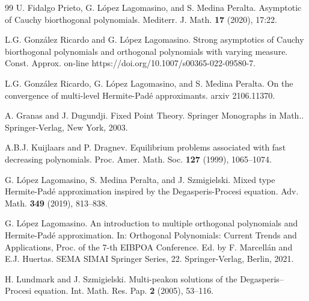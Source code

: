 \documentclass{amsart}
\numberwithin{equation}{section}
\theoremstyle{definition}
\begin{document}
\begin{thebibliography}{99}
     U. Fidalgo Prieto, G. López Lagomasino, and S. Medina Peralta. Asymptotic of Cauchy biorthogonal polynomials.  {Mediterr. J. Math.} \textbf{17} (2020), 17:22. %



 L.G. González Ricardo and G. López Lagomasino. Strong asymptotics of Cauchy biorthogonal polynomials and orthogonal polynomials with varying measure. Const. Approx. on-line
https://doi.org/10.1007/s00365-022-09580-7.

        L.G. González Ricardo, G. López Lagomasino, and S. Medina Peralta. On the convergence of multi-level Hermite-Padé approximants. arxiv 2106.11370.


     A. Granas and J. Dugundji. Fixed Point Theory. Springer Monographs in Math.. Springer-Verlag, New York, 2003.

     A.B.J. Kuijlaars and P. Dragnev. Equilibrium problems associated with fast decreasing polynomials. {Proc. Amer. Math. Soc.} \textbf{127} (1999), 1065--1074. %

     G. López Lagomasino, S. Medina Peralta, and J. Szmigielski. Mixed type Hermite-Padé approximation inspired by the Degasperis-Procesi equation.  {Adv. Math.} \textbf{349} (2019), 813--838. %

     G. López Lagomasino. An introduction to multiple orthogonal polynomials and Hermite-Padé approximation. In:  {Orthogonal Polynomials: Current Trends and Applications, Proc. of the 7-th EIBPOA Conference}. Ed. by F. Marcellán and E.J. Huertas. SEMA SIMAI Springer Series, 22. Springer-Verlag, Berlin, 2021. %

     H. Lundmark and J. Szmigielski. Multi-peakon solutions of the Degasperis–Procesi equation. {Int. Math. Res. Pap.} \textbf{2} (2005), 53--116. %


\end{thebibliography}
\end{document}
